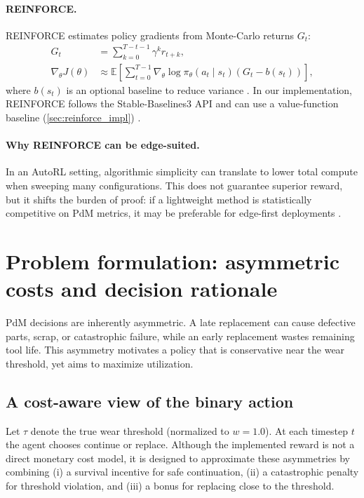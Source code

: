 \documentclass[11pt]{article}
\begin{document}
\paragraph{REINFORCE.}
REINFORCE estimates policy gradients from Monte-Carlo returns $G_t$:
\begin{align}
	G_t &= \sum_{k=0}^{T-t-1} \gamma^k r_{t+k},\\
	\nabla_\theta J(\theta) &\approx \mathbb{E}\left[\sum_{t=0}^{T-1} \nabla_\theta \log \pi_\theta(a_t\mid s_t)(G_t - b(s_t))\right],
\end{align}
where $b(s_t)$ is an optional baseline to reduce variance \parencite{Williams1992REINFORCE}. In our implementation, REINFORCE follows the Stable-Baselines3 API and can use a value-function baseline (\cref{sec:reinforce_impl}) \parencite{StableBaselines3}.

\paragraph{Why REINFORCE can be edge-suited.}
In an AutoRL setting, algorithmic simplicity can translate to lower total compute when sweeping many configurations. This does not guarantee superior reward, but it shifts the burden of proof: if a lightweight method is statistically competitive on PdM metrics, it may be preferable for edge-first deployments \parencite{Schwartz2020GreenAI, Njor2024TinyML}.

\section{Problem formulation: asymmetric costs and decision rationale}
\label{sec:problem}
PdM decisions are inherently asymmetric. A late replacement can cause defective parts, scrap, or catastrophic failure, while an early replacement wastes remaining tool life. This asymmetry motivates a policy that is conservative near the wear threshold, yet aims to maximize utilization.

\subsection{A cost-aware view of the binary action}
Let $\tau$ denote the true wear threshold (normalized to $w=1.0$). At each timestep $t$ the agent chooses continue or replace. Although the implemented reward is not a direct monetary cost model, it is designed to approximate these asymmetries by combining (i) a survival incentive for safe continuation, (ii) a catastrophic penalty for threshold violation, and (iii) a bonus for replacing close to the threshold.
\end{document}
